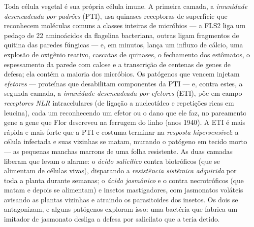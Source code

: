 \begin{definition}\label{def:b3:plant-molecular-physiology:immunity}
Toda célula vegetal é sua própria célula imune. A primeira camada, a
\emph{imunidade desencadeada por padrões} (PTI), usa quinases receptoras
de superfície que reconhecem moléculas comuns a classes inteiras de
micróbios --- a FLS2 liga um pedaço de 22 aminoácidos da flagelina
bacteriana, outras ligam fragmentos de quitina das paredes fúngicas ---
e, em minutos, lança um influxo de cálcio, uma explosão de oxigênio
reativo, cascatas de quinases, o fechamento dos estômatos, o
espessamento da parede com calose e a transcrição de centenas de genes de
defesa; ela contém a maioria dos micróbios. Os patógenos que vencem
injetam \emph{efetores} --- proteínas que desabilitam componentes da PTI
--- e, contra estes, a segunda camada, a \emph{imunidade desencadeada por
efetores} (ETI), põe em campo \emph{receptores NLR} intracelulares (de
ligação a nucleotídeo e repetições ricas em leucina), cada um
reconhecendo um efetor ou o dano que ele faz, no pareamento gene a gene
que Flor descreveu na ferrugem do linho (anos 1940). A ETI é mais rápida
e mais forte que a PTI e costuma terminar na \emph{resposta
hipersensível}: a célula infectada e suas vizinhas se matam, murando o
patógeno em tecido morto --- as pequenas manchas marrons de uma folha
resistente. As duas camadas liberam  que levam o alarme: o
\emph{ácido salicílico} contra biotróficos (que se alimentam de células
vivas), disparando a \emph{resistência sistêmica adquirida} por toda a
planta durante semanas; o \emph{ácido jasmônico} e o  contra
necrotróficos (que matam e depois se alimentam) e insetos mastigadores,
com jasmonatos voláteis avisando as plantas vizinhas e atraindo os
parasitoides dos insetos. Os dois  se antagonizam, e alguns
patógenos exploram isso: uma bactéria que fabrica um imitador de
jasmonato desliga a defesa por salicilato que a teria detido.
\end{definition}

